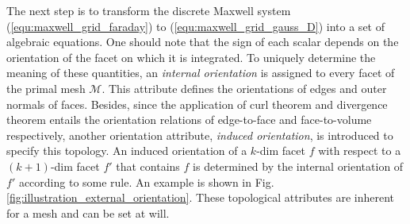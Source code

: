 \documentclass{report}
\begin{document}
The next step is to transform the discrete Maxwell system (\ref{equ:maxwell_grid_faraday}) to (\ref{equ:maxwell_grid_gauss_D}) into a set of algebraic equations. One should note that the sign of each scalar depends on the orientation of the facet on which it is integrated. To uniquely determine the meaning of these quantities, an \emph{internal orientation} is assigned to every facet of the primal mesh $\mathcal{M}$. This attribute defines the orientations of edges and outer normals of faces. Besides, since the application of curl theorem and divergence theorem entails the orientation relations of edge-to-face and face-to-volume respectively, another orientation attribute, \emph{induced orientation}, is introduced to specify this topology. An induced orientation of a $k$-dim facet $f$ with respect to a $(k+1)$-dim facet $f'$ that contains $f$ is determined by the internal orientation of $f'$ according to some rule. An example is shown in Fig. \ref{fig:illustration_external_orientation}.
These topological attributes are inherent for a mesh and can be set at will.
\end{document}
